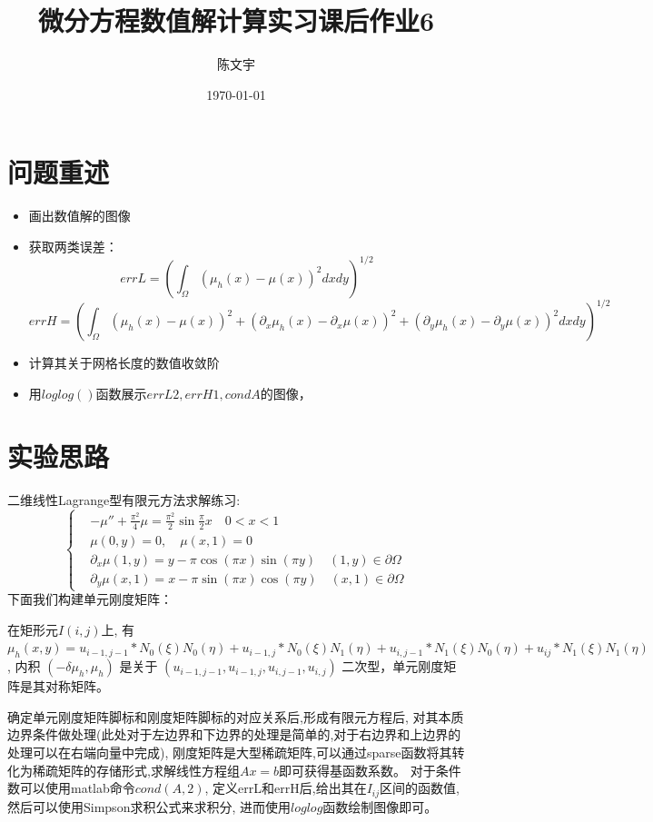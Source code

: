 \documentclass{article}
\title{微分方程数值解计算实习课后作业6}
\author{陈文宇}
\date{\today}
\begin{document}
\maketitle %

\tableofcontents %

\newpage
\section{问题重述}

\begin{itemize}
    \item 画出数值解的图像
    \item 获取两类误差：
    $$ errL=(\int_{\Omega}(\mu_{h}(x)-\mu(x))^{2}dxdy)^{1/2}$$
    $$ errH=(\int_{\Omega}(\mu_{h}(x)-\mu(x))^{2}+(\partial_{x}\mu_{h}(x)-\partial_{x}\mu(x))^{2}+(\partial_{y}\mu_{h}(x)-\partial_{y}\mu(x))^{2}dxdy)^{1/2}$$
    \item 计算其关于网格长度的数值收敛阶
    \item 用$loglog()$函数展示$errL2,errH1,condA$的图像，
\end{itemize}
 
\section{实验思路}
二维线性Lagrange型有限元方法求解练习:
\[
\left\{
\begin{aligned}
	&-\mu '' + \frac{\pi^{2}}{4}\mu = \frac{\pi^{2}}{2}\sin{\frac{\pi}{2}x} \quad0<x<1 
	\\
	&\mu(0,y)=0 ,\quad \mu(x,1)=0 
        \\
        &\partial_{x}\mu(1,y)=y-\pi\cos(\pi x)\sin(\pi y) \quad (1,y)\in\partial\Omega
        \\
        &\partial_{y}\mu(x,1)=x-\pi\sin(\pi x)\cos(\pi y) \quad (x,1)\in\partial\Omega
\end{aligned}
\right.
\]
下面我们构建单元刚度矩阵：

在矩形元$I(i,j)$上,
有$\mu_{h}(x,y)=u_{i-1,j-1}*N_{0}(\xi)N_{0}(\eta)+u_{i-1,j}*N_{0}(\xi)N_{1}(\eta)+u_{i,j-1}*N_{1}(\xi)N_{0}(\eta)+u_{ij}*N_{1}(\xi)N_{1}(\eta)$,
内积 $(-\delta\mu_{h},\mu_{h})$ 是关于 $(u_{i-1,j-1},u_{i-1,j},u_{i,j-1},u_{i,j})$ 二次型，单元刚度矩阵是其对称矩阵。

确定单元刚度矩阵脚标和刚度矩阵脚标的对应关系后,形成有限元方程后,
对其本质边界条件做处理(此处对于左边界和下边界的处理是简单的,对于右边界和上边界的处理可以在右端向量中完成),
刚度矩阵是大型稀疏矩阵,可以通过sparse函数将其转化为稀疏矩阵的存储形式,求解线性方程组$Ax=b$即可获得基函数系数。
对于条件数可以使用matlab命令$cond(A,2)$,
定义errL和errH后,给出其在$ I_{ij} $区间的函数值,然后可以使用Simpson求积公式来求积分,
进而使用$loglog$函数绘制图像即可。
\end{document}
